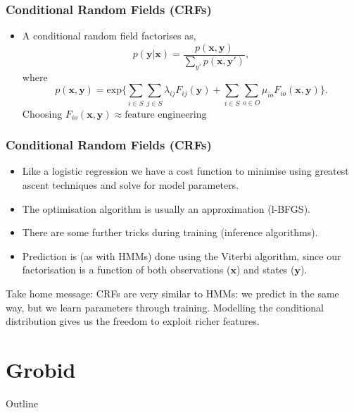 \documentclass{beamer}
\begin{document}

\begin{frame}

\frametitle{Conditional Random Fields (CRFs)}
\begin{itemize}
\item A conditional random field factorises as,
$$p(\textbf{y}|\textbf{x}) = \frac{p(\textbf{x}, \textbf{y})}{\sum_{y'}{p(\textbf{x}, \textbf{y}')}},$$ where
$$
p(\textbf{x}, \textbf{y}) = \text{exp} \Bigg\{
\sum_{i \in S}
\sum_{j \in S}
\lambda_{ij}
F_{ij}(\textbf{y})
+ 
\sum_{i \in S}
\sum_{o \in O}
\mu_{io}
F_{io}(\textbf{x}, \textbf{y})
\Bigg\}.
$$
Choosing $F_{io}(\textbf{x}, \textbf{y}) \approx \text{feature engineering}$
\end{itemize}

\end{frame}




\begin{frame}
\frametitle{Conditional Random Fields (CRFs)}
\begin{itemize}
\item Like a logistic regression we have a cost function to minimise using greatest ascent techniques and solve for model parameters.
\item The optimisation algorithm is usually an approximation (l-BFGS).
\item There are some further tricks during training (inference algorithms).
\item Prediction is (as with HMMs) done using the Viterbi algorithm, since our factorisation is a function of both observations ($\mathbf{x}$) and states ($\mathbf{y}$).
\end{itemize}
Take home message: CRFs are very similar to HMMs: we predict in the same way, but we learn parameters through training. Modelling the conditional distribution gives us the freedom to exploit richer features.
\end{frame}


\section{Grobid}
\begin{frame}[noframenumbering]{Outline}
\tableofcontents[currentsection]
\end{frame}
\end{document}
